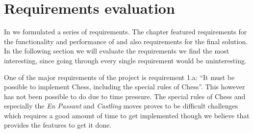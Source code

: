 \section{Requirements evaluation}
\label{sec:requirementsevaluation}

In  we formulated a series of requirements. The chapter featured requirements for the functionality and performance of \productname{} and also requirements for the final solution. In the following section we will evaluate the requirements we find the most interesting, since going through every single requirement would be uninteresting. 

One of the major requirements of the project is requirement 1.a: ``It must be possible to implement Chess, including the special rules of Chess''. This however has not been possible to do due to time pressure. The special rules of Chess and especially the \emph{En Passant} and \emph{Castling} moves proves to be difficult challenges which requires a good amount of time to get implemented though we believe that \productname{} provides the features to get it done.  